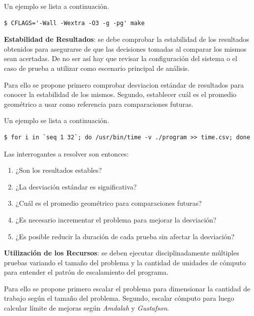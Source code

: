 \documentclass[a4paper]{report}
\begin{document}
\bigskip

Un ejemplo se lista a continuación.

\begin{lstlisting}[caption={Compilación del Binario},label={lst:compilation}]
$ CFLAGS='-Wall -Wextra -O3 -g -pg' make
\end{lstlisting}

\bigskip

{\bf Estabilidad de Resultados}: se debe comprobar la estabilidad de los resultados obtenidos para asegurarse de que las decisiones tomadas al comparar los mismos sean acertadas. De no ser así hay que revisar la configuración del sistema o el caso de prueba a utilizar como escenario principal de análisis.

\bigskip

Para ello se propone primero comprobar desviacion estándar de resultados para conocer la estabilidad de los mismos. Segundo, establecer cuál es el promedio geométrico a usar como referencia para comparaciones futuras.

\bigskip

Un ejemplo se lista a continuación.

\begin{lstlisting}[caption={Estabilidad de Resultados},label={lst:time}]
$ for i in `seq 1 32`; do /usr/bin/time -v ./program >> time.csv; done
\end{lstlisting}

Las interrogantes a resolver son entonces:

\begin{enumerate}
\item ¿Son los resultados estables?
\item ¿La desviación estándar es significativa?
\item ¿Cuál es el promedio geométrico para comparaciones futuras?
\item ¿Es necesario incrementar el problema para mejorar la desviación?
\item ¿Es posible reducir la duración de cada prueba sin afectar la desviación?
\end{enumerate}

{\bf Utilización de los Recursos}: se deben ejecutar disciplinadamente múltiples pruebas variando el tamaño del problema y la cantidad de unidades de cómputo para entender el patrón de escalamiento del programa.

\bigskip

Para ello se propone primero escalar el problema para dimensionar la cantidad de trabajo según el tamaño del problema. Segundo, escalar cómputo para luego calcular límite de mejoras según {\it Amdalah} y {\it Gustafson}.
\end{document}
